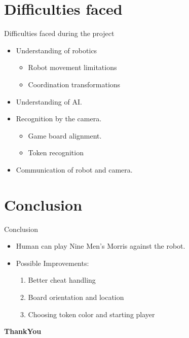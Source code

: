 \documentclass{beamer}
\begin{document}
\section{Difficulties faced}
\begin{frame}{Difficulties faced during the project}
\begin{itemize}
\item Understanding of robotics
\begin{itemize}
\item Robot movement limitations
\item Coordination transformations
\end{itemize}
\item Understanding of AI.
\item Recognition by the camera.
\begin{itemize}
\item Game board alignment.
\item Token recognition
\end{itemize}
\item Communication of robot and camera.
\end{itemize}
\end{frame}


\section{Conclusion}
\begin{frame}{Conclusion}
\begin{itemize}
\item Human can play Nine Men's Morris against the robot.
\item Possible Improvements:
\begin{enumerate}
\item Better cheat handling
\item Board orientation and location
\item Choosing token color and starting player
\end{enumerate}
\end{itemize}
\end{frame}


\begin{frame}
\begin{center}  
\Huge \textbf{ThankYou}
\end{center}
\end{frame}
\end{document}
